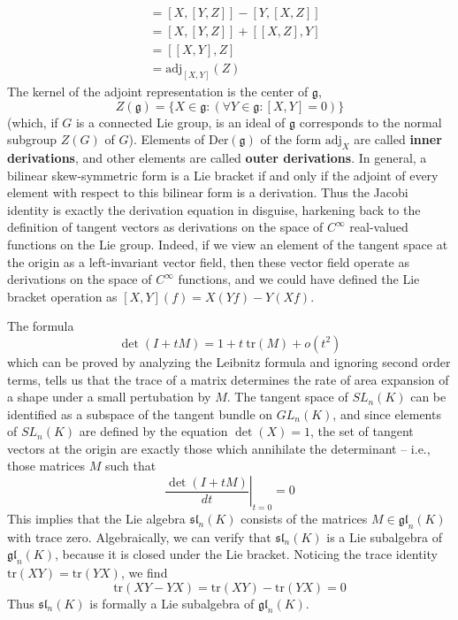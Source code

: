 \begin{example}
\begin{align*}
        &= [X,[Y,Z]] - [Y,[X,Z]]\\
        &= [X,[Y,Z]] + [[X,Z],Y]\\
        &= [[X,Y],Z]\\
        &= \text{adj}_{[X,Y]}(Z)
    \end{align*}
    The kernel of the adjoint representation is the center of $\mathfrak{g}$,
    \[ Z(\mathfrak{g}) = \{ X \in \mathfrak{g} : (\forall Y \in \mathfrak{g}: [X,Y] = 0) \} \]
    (which, if $G$ is a connected Lie group, is an ideal of $\mathfrak{g}$ corresponds to the normal subgroup $Z(G)$ of $G$). Elements of $\text{Der}(\mathfrak{g})$ of the form $\text{adj}_X$ are called {\bf inner derivations}, and other elements are called {\bf outer derivations}. In general, a bilinear skew-symmetric form is a Lie bracket if and only if the adjoint of every element with respect to this bilinear form is a derivation. Thus the Jacobi identity is exactly the derivation equation in disguise, harkening back to the definition of tangent vectors as derivations on the space of $C^\infty$ real-valued functions on the Lie group. Indeed, if we view an element of the tangent space at the origin as a left-invariant vector field, then these vector field operate as derivations on the space of $C^\infty$ functions, and we could have defined the Lie bracket operation as $[X, Y](f) = X(Yf) - Y(Xf)$.
\end{example}

\begin{example}
    The formula
    \[ \det(I + tM) = 1 + t\ \text{tr}(M) + o(t^2) \]
    which can be proved by analyzing the Leibnitz formula and ignoring second order terms, tells us that the trace of a matrix determines the rate of area expansion of a shape under a small pertubation by $M$. The tangent space of $SL_n(K)$ can be identified as a subspace of the tangent bundle on $GL_n(K)$, and since elements of $SL_n(K)$ are defined by the equation $\det(X) = 1$, the set of tangent vectors at the origin are exactly those which annihilate the determinant -- i.e., those matrices $M$ such that
    \[ \left. \frac{\det(I + tM)}{dt} \right|_{t = 0} = 0 \]
    This implies that the Lie algebra $\mathfrak{sl}_n(K)$ consists of the matrices $M \in \mathfrak{gl}_n(K)$ with trace zero. Algebraically, we can verify that $\mathfrak{sl}_n(K)$ is a Lie subalgebra of $\mathfrak{gl}_n(K)$, because it is closed under the Lie bracket. Noticing the trace identity $\text{tr}(XY) = \text{tr}(YX)$, we find
    \[ \text{tr}(XY - YX) = \text{tr}(XY) - \text{tr}(YX) = 0 \]
    Thus $\mathfrak{sl}_n(K)$ is formally a Lie subalgebra of $\mathfrak{gl}_n(K)$.
\end{example}

